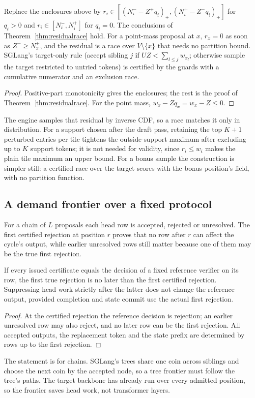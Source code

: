 \begin{theorem}\label{thm:residualself}
Replace the enclosures above by $r_i\in[(N^-_i-Z^+q_i)_+,(N^+_i-Z^-q_i)_+]$ for $q_i>0$ and $r_i\in[N_i^-,N_i^+]$ for $q_i=0$. The conclusions of Theorem~\ref{thm:residualrace} hold. For a point-mass proposal at $x$, $r_x=0$ as soon as $Z^-\ge N^+_x$, and the residual is a race over $V\setminus\{x\}$ that needs no partition bound. SGLang's target-only rule (accept sibling $j$ if $UZ<\sum_{l\le j}w_{x_l}$; otherwise sample the target restricted to untried tokens) is certified by the guards with a cumulative numerator and an exclusion race.
\end{theorem}
\begin{proof}
Positive-part monotonicity gives the enclosures; the rest is the proof of Theorem~\ref{thm:residualrace}. For the point mass, $w_x-Zq_x=w_x-Z\le0$.
\end{proof}
The engine samples that residual by inverse CDF, so a race matches it only in distribution. For a support chosen after the draft pass, retaining the top $K+1$ perturbed entries per tile tightens the outside-support maximum after excluding up to $K$ support tokens; it is not needed for validity, since $r_i\le w_i$ makes the plain tile maximum an upper bound. For a bonus sample the construction is simpler still: a certified race over the target scores with the bonus position's field, with no partition function.

\subsection{A demand frontier over a fixed protocol}\label{sec:frontier}
For a chain of $L$ proposals each head row is accepted, rejected or unresolved. The first certified rejection at position $r$ proves that no row after $r$ can affect the cycle's output, while earlier unresolved rows still matter because one of them may be the true first rejection.

\begin{proposition}\label{prop:frontier}
If every issued certificate equals the decision of a fixed reference verifier on its row, the first true rejection is no later than the first certified rejection. Suppressing head work strictly after the latter does not change the reference output, provided completion and state commit use the actual first rejection.
\end{proposition}
\begin{proof}
At the certified rejection the reference decision is rejection; an earlier unresolved row may also reject, and no later row can be the first rejection. All accepted outputs, the replacement token and the state prefix are determined by rows up to the first rejection.
\end{proof}
The statement is for chains. SGLang's trees share one coin across siblings and choose the next coin by the accepted node, so a tree frontier must follow the tree's paths. The target backbone has already run over every admitted position, so the frontier saves head work, not transformer layers.

